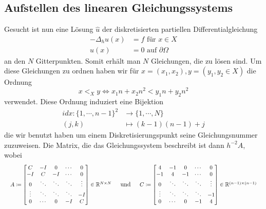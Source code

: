 \documentclass{scrartcl}
\theoremstyle{remark}
\begin{document}
\subsection{Aufstellen des linearen Gleichungssystems}
Gesucht ist nun eine Lösung \(\hat{u}\) der diskretisierten partiellen Differentialgleichung
\begin{align*}
  -\Delta_{h} u(x) &= f \text{       für } x \in X   \\
              u(x) &= 0 \text{       auf } \partial \Omega
\end{align*}
an den \(N\) Gitterpunkten. Somit erhält man \(N\) Gleichungen, die zu lösen sind. Um diese Gleichungen zu ordnen
haben wir für \(x = (x_{1}, x_{2}), y = (y_{1}, y_{2} \in X)\) die Ordnung
\[x <_{X} y \iff x_{1}n + x_{2}n^{2} < y_{1}n + y_{2}n^{2}\]
verwendet. Diese Ordnung induziert eine Bijektion
\begin{align*}
  idx: \{1, \cdots ,n - 1\}^{2} &\longrightarrow \{1, \cdots ,N \} \\ 
                          (j, k)&\longmapsto (k - 1)(n - 1) + j
\end{align*}
die wir benutzt haben um einem Diskretisierungspunkt seine Gleichungsnummer zuzuweisen. Die Matrix, die das Gleichungssystem beschreibt ist dann
\(h^{-2}A\), wobei
\[
\begin{array}{ccc}
  \scalebox{0.9}{$
  \begin{array}{l}
    A \coloneq \begin{bmatrix}
    C & -I & 0 & \cdots & 0 \\
    -I & C & -I & \cdots & 0 \\
    0 & \ddots & \ddots & \ddots & \vdots \\
    \vdots & \ddots & \ddots & \ddots & -I \\
    0 & \cdots & 0 & -I & C
    \end{bmatrix}
    \in \mathbb{R}^{N \times N}
  \end{array}
  $}
  &
  \text{und}
  &
  \scalebox{0.9}{$
  \begin{array}{l}
    C \coloneq \begin{bmatrix}
    4 & -1 & 0 & \cdots & 0 \\
    -1 & 4 & -1 & \cdots & 0 \\
    0 & \ddots & \ddots & \ddots & \vdots \\
    \vdots & \ddots & \ddots & \ddots & -1 \\
    0 & \cdots & 0 & -1 & 4
    \end{bmatrix}
    \in \mathbb{R}^{(n-1) \times (n-1)}
  \end{array}
  $}
\end{array}
\] \cite{PPI_Poisson} 
\end{document}
